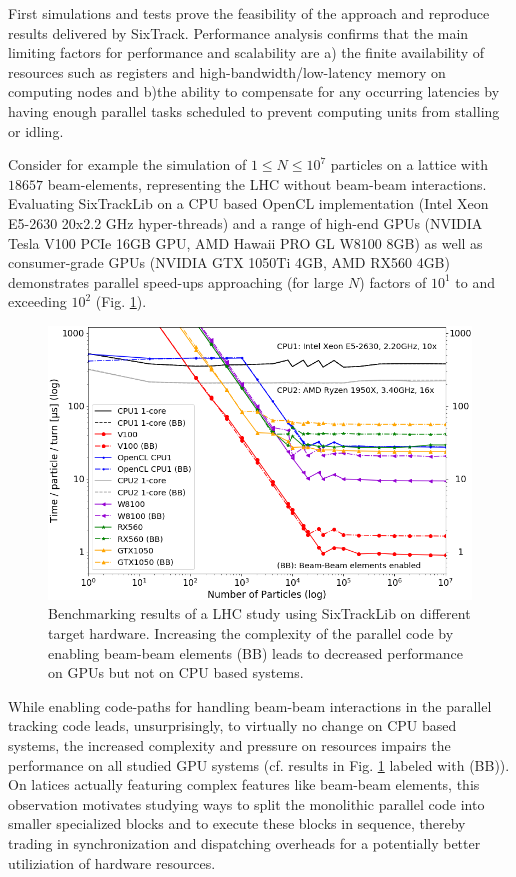 \documentclass[a4paper,
              ]{jacow}
\begin{document}
First simulations and tests prove the feasibility of the approach and reproduce results delivered by SixTrack. Performance analysis confirms that the main limiting factors for performance and scalability are a) the finite 
availability of resources such as registers and high-bandwidth/low-latency memory on computing nodes and b)the ability to 
compensate for any occurring latencies by having enough parallel tasks scheduled to prevent computing units from stalling or idling. 

Consider for example the simulation of $1 \leq N \leq 10^7$ particles on a lattice with $18657$ beam-elements, representing the LHC without beam-beam interactions. Evaluating SixTrackLib on a CPU based OpenCL implementation (Intel Xeon E5-2630 20x2.2 GHz hyper-threads) and a range of high-end GPUs (NVIDIA Tesla V100 PCIe 16GB GPU, AMD Hawaii PRO GL W8100 8GB) as well as consumer-grade GPUs (NVIDIA GTX 1050Ti 4GB, AMD RX560 4GB) demonstrates parallel speed-ups approaching (for large $N$) factors of $10^1$ to and exceeding $10^2$ (Fig. \ref{fig:sixtracklib_results}). 
\begin{figure}[htb]
 \centering
 \includegraphics[scale=0.26]{devices_times_per_particle_and_turn.png}
 \caption{Benchmarking results of a LHC study using SixTrackLib on different target hardware. Increasing the complexity of the parallel code by enabling beam-beam elements (BB) leads to decreased performance on GPUs but not on CPU based systems.}
 \label{fig:sixtracklib_results}
\end{figure}
While enabling code-paths for handling beam-beam interactions in the parallel tracking code leads, unsurprisingly, to virtually no change on CPU based systems, the increased complexity and pressure on resources impairs the performance on all studied GPU systems (cf. results in Fig. \ref{fig:sixtracklib_results} labeled with (BB)). On latices actually featuring complex features like beam-beam elements, this observation motivates studying ways to split the monolithic parallel code into smaller specialized blocks and to execute these blocks in sequence, thereby trading in synchronization and dispatching overheads for a potentially better utiliziation of hardware resources.
\end{document}

